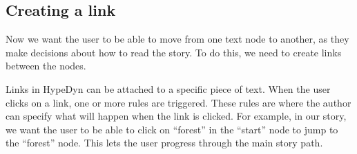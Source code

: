 \documentclass{article}
\begin{document}
\subsection{Creating a link}

Now we want the user to be able to move from one text node to another, as they
make decisions about how to read the story. To do this, we need to create links
between the nodes.

Links in HypeDyn can be attached to a specific piece of text. When the user
clicks on a link, one or more rules are triggered. These rules are where the
author can specify what will happen when the link is clicked. For example, in our
story, we want the user to be able to click on ``forest'' in the ``start'' node
to jump to the ``forest'' node. This lets the user progress through the main
story path.
\end{document}
